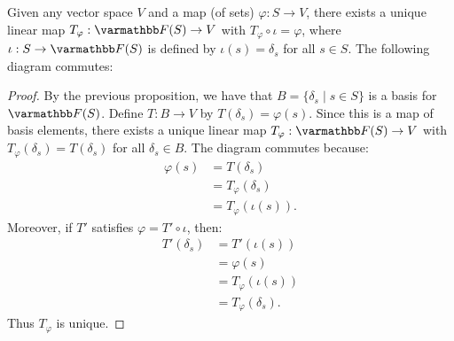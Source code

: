     \begin{theorem}
        Given any vector space $V$ and a map (of sets) $\varphi:S \rightarrow V$, there exists a unique linear map $T_\varphi : \bfF(S) \rightarrow V$ with $T_\varphi \circ \iota = \varphi$, where $\iota:S \rightarrow \bfF(S)$ is defined by $\iota(s) = \delta_s$ for all $s \in S$. The following diagram commutes:
            \begin{center}
            \end{center}
    \end{theorem}
        \begin{proof}
            By the previous proposition, we have that $B = \{\delta_s \mid s \in S\}$ is a basis for $\bfF(S)$. Define $T:B \rightarrow V$ by $T(\delta_s) = \varphi(s)$. Since this is a map of basis elements, there exists a unique linear map $T_\varphi:\bfF(S) \rightarrow V$ with $T_\varphi(\delta_s) = T(\delta_s)$ for all $\delta_s \in B$. The diagram commutes because:
                \begin{equation*}
                \begin{split}
                    \varphi(s)
                    & = T(\delta_s) \\
                    & = T_\varphi(\delta_s) \\
                    & = T_\varphi(\iota(s)).
                \end{split}
                \end{equation*}
            Moreover, if $T'$ satisfies $\varphi = T' \circ \iota$, then:
                \begin{equation*}
                \begin{split}
                    T'(\delta_s)
                    & = T'(\iota(s)) \\
                    & = \varphi(s) \\
                    & = T_\varphi(\iota(s)) \\
                    & = T_\varphi(\delta_s).
                \end{split}
                \end{equation*}
            Thus $T_\varphi$ is unique.
        \end{proof}

